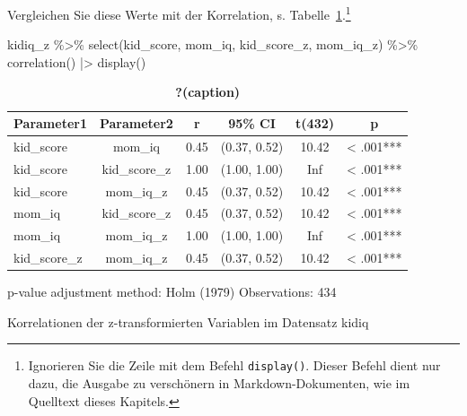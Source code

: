 \documentclass[
  a4paper,
  DIV=11]{scrreprt}
\newenvironment{Shaded}{\begin{snugshade}}{\end{snugshade}}
\newcommand{\FunctionTok}[1]{\textcolor[rgb]{0.28,0.35,0.67}{#1}}
\newcommand{\NormalTok}[1]{\textcolor[rgb]{0.00,0.23,0.31}{#1}}
\newcommand{\SpecialCharTok}[1]{\textcolor[rgb]{0.37,0.37,0.37}{#1}}
\theoremstyle{definition}
\theoremstyle{remark}
\begin{document}
Vergleichen Sie diese Werte mit der Korrelation, s.
Tabelle~\ref{tbl-m10.11-corr}.\footnote{Ignorieren Sie die Zeile mit dem
  Befehl \texttt{display()}. Dieser Befehl dient nur dazu, die Ausgabe
  zu verschönern in Markdown-Dokumenten, wie im Quelltext dieses
  Kapitels.}

\begin{Shaded}
\begin{Highlighting}[]
\NormalTok{kidiq\_z }\SpecialCharTok{\%\textgreater{}\%} 
  \FunctionTok{select}\NormalTok{(kid\_score, mom\_iq, kid\_score\_z, mom\_iq\_z) }\SpecialCharTok{\%\textgreater{}\%} 
  \FunctionTok{correlation}\NormalTok{() }\SpecialCharTok{|\textgreater{}} 
  \FunctionTok{display}\NormalTok{()}
\end{Highlighting}
\end{Shaded}

\begin{table}

\caption{\label{tbl-m10.11-corr}\textbf{?(caption)}}\begin{minipage}[t]{\linewidth}

{\centering 

\begin{tabular}[t]{lccccc}
\toprule
Parameter1 & Parameter2 & r & 95\% CI & t(432) & p\\
\midrule
kid\_score & mom\_iq & 0.45 & (0.37, 0.52) & 10.42 & \textless{}
.001***\\
kid\_score & kid\_score\_z & 1.00 & (1.00, 1.00) & Inf & \textless{}
.001***\\
kid\_score & mom\_iq\_z & 0.45 & (0.37, 0.52) & 10.42 & \textless{}
.001***\\
mom\_iq & kid\_score\_z & 0.45 & (0.37, 0.52) & 10.42 & \textless{}
.001***\\
mom\_iq & mom\_iq\_z & 1.00 & (1.00, 1.00) & Inf & \textless{} .001***\\
kid\_score\_z & mom\_iq\_z & 0.45 & (0.37, 0.52) & 10.42 & \textless{}
.001***\\
\bottomrule
\end{tabular}

}

\end{minipage}%
\newline
\begin{minipage}[t]{\linewidth}

{\centering 

p-value adjustment method: Holm (1979) Observations: 434

}

\end{minipage}%
\newline
\begin{minipage}[t]{\linewidth}

{\centering 

Korrelationen der z-transformierten Variablen im Datensatz kidiq

}

\end{minipage}%

\end{table}
\end{document}

